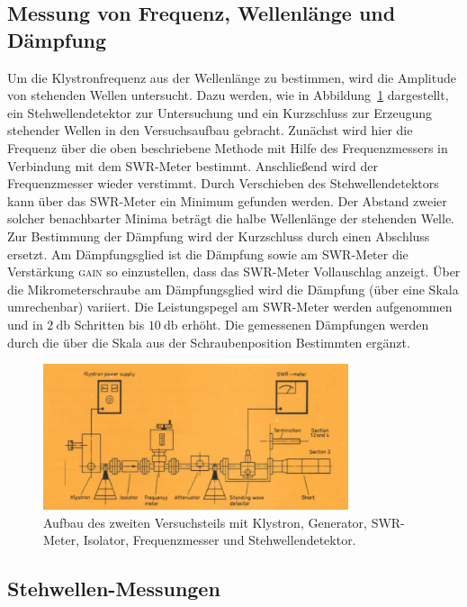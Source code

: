 \subsection{Messung von Frequenz, Wellenlänge und Dämpfung}

Um die Klystronfrequenz aus der Wellenlänge zu bestimmen, wird die Amplitude von stehenden Wellen untersucht.
Dazu werden, wie in Abbildung~\ref{fig:aufbau2} dargestellt, ein Stehwellendetektor zur Untersuchung und ein Kurzschluss zur Erzeugung stehender Wellen in den Versuchsaufbau gebracht.
Zunächst wird hier die Frequenz über die oben beschriebene Methode mit Hilfe des Frequenzmessers in Verbindung mit dem SWR-Meter bestimmt.
Anschließend wird der Frequenzmesser wieder verstimmt.
Durch Verschieben des Stehwellendetektors kann über das SWR-Meter ein Minimum gefunden werden.
Der Abstand zweier solcher benachbarter Minima beträgt die halbe Wellenlänge der stehenden Welle.
Zur Bestimmung der Dämpfung wird der Kurzschluss durch einen Abschluss ersetzt.
Am Dämpfungsglied ist die Dämpfung sowie am SWR-Meter die Verstärkung \textsc{gain} so einzustellen, dass das SWR-Meter Vollauschlag anzeigt.
Über die Mikrometerschraube am Dämpfungsglied wird die Dämpfung (über eine Skala umrechenbar) variiert.
Die Leistungspegel am SWR-Meter werden aufgenommen und in $\SI{2}{\decibel}$ Schritten bis $\SI{10}{\decibel}$ erhöht.
Die gemessenen Dämpfungen werden durch die über die Skala aus der Schraubenposition Bestimmten ergänzt.

\begin{figure}[h]
    \centering
    \includegraphics[width=0.8\textwidth]{figure/Aufbau_2.PNG}
    \caption{Aufbau des zweiten Versuchsteils mit Klystron, Generator, SWR-Meter, Isolator, Frequenzmesser und Stehwellendetektor.\cite{V53}}
    \label{fig:aufbau2}
\end{figure}

\subsection{Stehwellen-Messungen}

